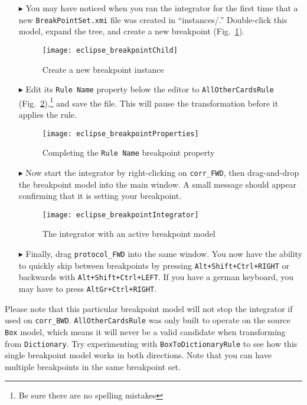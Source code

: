 \begin{itemize}

\item[$\blacktriangleright$] You may have noticed when you ran the integrator for the first time that a new \texttt{BreakPointSet.xmi} file was created in
``instances/.'' Dou\-ble-click this model, expand the tree, and create a new breakpoint (Fig.~\ref{eclipse:breakpointChild}).

\begin{figure}[htbp]
\begin{center}
  \texttt{[image: eclipse\_breakpointChild]}
  \caption{Create a new breakpoint instance}
  \label{eclipse:breakpointChild}
\end{center}
\end{figure}

\item[$\blacktriangleright$] Edit its \texttt{Rule Name} property below the editor to \texttt{AllOtherCardsRule} (Fig.~\ref{eclipse:bpProps}).\footnote{Be sure
there are no spelling mistakes} and save the file. This will pause the transformation before it applies the rule.

\begin{figure}[htbp]
\begin{center}
  \texttt{[image: eclipse\_breakpointProperties]}
  \caption{Completing the \texttt{Rule Name} breakpoint property}
  \label{eclipse:bpProps}
\end{center}
\end{figure}

\item[$\blacktriangleright$] Now start the integrator by right-clicking on \texttt{corr\_FWD}, then drag-and-drop the breakpoint model into
the main window. A small message should appear confirming that it is setting your breakpoint. 

\begin{figure}[htbp]
\begin{center}
  \texttt{[image: eclipse\_breakpointIntegrator]}
  \caption{The integrator with an active breakpoint model}
  \label{eclipse:bpIntegrator}
\end{center}
\end{figure}

\item[$\blacktriangleright$] Finally, drag \texttt{protocol\_FWD} into the same window. You now have the ability to quickly skip between breakpoints
by pressing \texttt{Alt\-+Shift\-+Ctrl\-+RIGHT} or backwards with \texttt{Alt\-+Shift\-+Ctrl\-+LEFT}. If you have a german keyboard, you may have to press
\texttt{AltGr+Ctrl+RIGHT}.

\end{itemize}

Please note that this particular breakpoint model will not stop the integrator if used on \texttt{corr\_BWD}. \texttt{AllOtherCardsRule} was only built to
operate on the source \texttt{Box} model, which means it will never be a valid candidate when transforming from \texttt{Dictionary}. Try experimenting with
\texttt{BoxToDictionaryRule} to see how this single breakpoint model works in both directions. Note that you can have multiple breakpoints in the same
breakpoint set.
